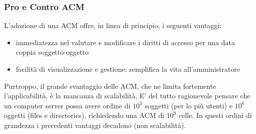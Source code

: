 \subsubsection{Pro e Contro ACM}
L’adozione di una ACM offre, in linea di principio, i seguenti vantaggi:
\begin{itemize} 
  \item immediatezza nel valutare e modificare i diritti di accesso per una data coppia soggetto-oggetto
  \item facilità di visualizzazione e gestione: semplifica la vita all’amministratore
\end{itemize}
Purtroppo, il grande svantaggio delle ACM, che ne limita fortemente l'applicabilità, è la mancanza di scalabilità. E' del tutto ragionevole pensare che un computer server possa avere ordine di $10^3$ soggetti (per lo più utenti) e $10^6$ oggetti (files e directories), richiedendo una ACM di $10^9$ celle. In questi ordini di grandezza i precedenti vantaggi decadono (non scalabilità).

